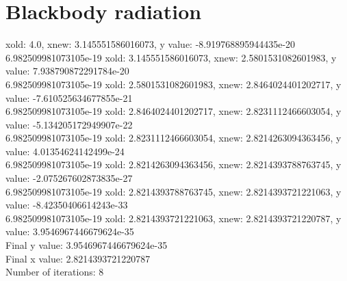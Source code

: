 \documentclass[12pt]{article}
\begin{document}
\pagebreak

\section{Blackbody radiation}

\begin{footnotesize}
\begin{spacing}{-.8}
xold: 4.0, xnew: 3.145551586016073, y value: -8.919768895944435e-20\\
6.982509981073105e-19
xold: 3.145551586016073, xnew: 2.5801531082601983, y value: 7.938790872291784e-20\\
6.982509981073105e-19
xold: 2.5801531082601983, xnew: 2.8464024401202717, y value: -7.610525634677855e-21\\
6.982509981073105e-19
xold: 2.8464024401202717, xnew: 2.8231112466603054, y value: -5.134205172949907e-22\\
6.982509981073105e-19
xold: 2.8231112466603054, xnew: 2.8214263094363456, y value: 4.01354624142499e-24\\
6.982509981073105e-19
xold: 2.8214263094363456, xnew: 2.8214393788763745, y value: -2.075267602873835e-27\\
6.982509981073105e-19
xold: 2.8214393788763745, xnew: 2.8214393721221063, y value: -8.42350406614243e-33\\
6.982509981073105e-19
xold: 2.8214393721221063, xnew: 2.8214393721220787, y value: 3.9546967446679624e-35\\
Final y value: 3.9546967446679624e-35\\
Final x value: 2.8214393721220787\\
Number of iterations: 8\\
\end{spacing}
\end{footnotesize}
\end{document}
